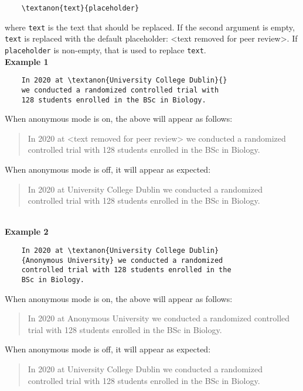 \documentclass[sigconf, balance=false]{acmart}
\begin{document}
\begin{verbatim}
    \textanon{text}{placeholder}
\end{verbatim}

\noindent where \texttt{text} is the text that should be replaced. If the second argument is empty, \texttt{text} is replaced with the default placeholder: <text removed for peer review>. If \texttt{placeholder} is non-empty, that is used to replace \texttt{text}. 
\ \\

\noindent \textbf{Example 1}

\begin{verbatim}
    In 2020 at \textanon{University College Dublin}{}
    we conducted a randomized controlled trial with
    128 students enrolled in the BSc in Biology.
\end{verbatim}

\noindent When anonymous mode is on, the above will appear as follows:
\begin{quote}
    In 2020 at <text removed for peer review> we conducted a randomized controlled trial with 128 students enrolled in the BSc in Biology. 
\end{quote}
When anonymous mode is off, it will appear as expected:
\begin{quote}
    In 2020 at University College Dublin we conducted a randomized controlled trial with 128 students enrolled in the BSc in Biology. 
\end{quote}
\ \\
\noindent \textbf{Example 2}

\begin{verbatim}
    In 2020 at \textanon{University College Dublin}
    {Anonymous University} we conducted a randomized
    controlled trial with 128 students enrolled in the
    BSc in Biology.
\end{verbatim}

\noindent When anonymous mode is on, the above will appear as follows:
\begin{quote}
    In 2020 at Anonymous University we conducted a randomized controlled trial with 128 students enrolled in the BSc in Biology. 
\end{quote}
When anonymous mode is off, it will appear as expected:
\begin{quote}
    In 2020 at University College Dublin we conducted a randomized controlled trial with 128 students enrolled in the BSc in Biology. 
\end{quote}
\end{document}
